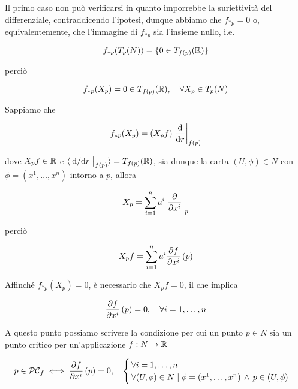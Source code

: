 Il primo caso non può verificarsi in quanto imporrebbe la suriettività del differenziale, contraddicendo l'ipotesi, dunque abbiamo che $ f_{*p} = 0 $ o, equivalentemente, che l'immagine di $ f_{*p} $ sia l'insieme nullo, i.e.

\begin{equation}
	f_{*p}(T_{p}(N)) = \{0 \in T_{f(p)}(\mathbb{R})\}
\end{equation}

perciò

\begin{equation}
	f_{*p}(X_{p}) = 0 \in T_{f(p)}(\R) \qcomma \forall X_{p} \in T_{p}(N)
\end{equation}

Sappiamo che

\begin{equation}
	f_{*p}(X_{p}) = (X_{p} f) \eval{ \dv{r} }_{f(p)}
\end{equation}

dove $ X_{p} f \in \mathbb{R} $ e $ \langle \eval{ \dv*{r} }_{f(p)} \rangle = T_{f(p)}(\R) $, sia dunque la carta $ (U,\phi) \in N $ con $ \phi = (x^{1},\dots,x^{n}) $ intorno a $ p $, allora

\begin{equation}
	X_{p} = \sum_{i=1}^{n} a^{i} \eval{ \pdv{x^{i}} }_{p}
\end{equation}

perciò

\begin{equation}
	X_{p} f = \sum_{i=1}^{n} a^{i} \pdv{f}{x^{i}} \, (p)
\end{equation}

Affinché $ f_{*p}(X_{p}) = 0 $, è necessario che $ X_{p} f = 0 $, il che implica

\begin{equation}
	\pdv{f}{x^{i}} \, (p) = 0 \qcomma \forall i=1,\dots,n
\end{equation}

A questo punto possiamo scrivere la condizione per cui un punto $ p \in N $ sia un punto critico per un'applicazione $ f : N \to \mathbb{R} $

\begin{equation}
	p \in \PC_{f} %
	\iff %
	\dpdv{f}{x^{i}} \, (p) = 0 \qcomma %
	\begin{cases}
		\forall i=1,\dots,n\\
		\forall (U,\phi) \in N \mid \phi = (x^{1},\dots,x^{n}) \, \wedge \, p \in (U,\phi)
	\end{cases}
\end{equation}

